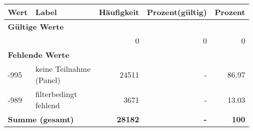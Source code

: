      \begin{longtable}{lXrrr}
     \toprule
     \textbf{Wert} & \textbf{Label} & \textbf{Häufigkeit} & \textbf{Prozent(gültig)} & \textbf{Prozent} \\
     \endhead
     \midrule
     \multicolumn{5}{l}{\textbf{Gültige Werte}}\\
      & & \num{0} & \num{0} & \num{0} \\
     \midrule
     \multicolumn{5}{l}{\textbf{Fehlende Werte}}\\
       -995 &
       keine Teilnahme (Panel) &
         \num{24511} &
        - &
         \num[round-mode=places,round-precision=2]{86.97} \\
       -989 &
       filterbedingt fehlend &
         \num{3671} &
        - &
         \num[round-mode=places,round-precision=2]{13.03} \\
     \midrule
     \multicolumn{2}{l}{\textbf{Summe (gesamt)}} &
          \textbf{\num{28182}} &
        \textbf{-} &
        \textbf{\num{100}} \\
     \bottomrule
     \end{longtable}
     
